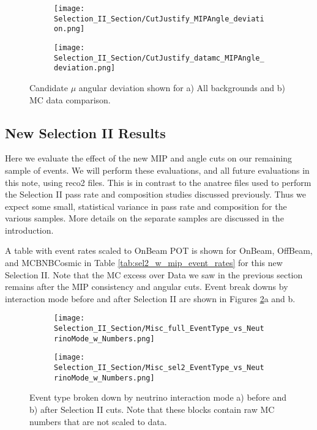 \begin{figure}[t!]
\centering
  \begin{subfigure}[t]{0.35\textwidth}
    \centering
\texttt{[image: Selection\_II\_Section/CutJustify\_MIPAngle\_deviation.png]}
    \caption{ }
  \end{subfigure} 
  \hspace{30mm}
  \begin{subfigure}[t]{0.35\textwidth}
    \centering
\texttt{[image: Selection\_II\_Section/CutJustify\_datamc\_MIPAngle\_deviation.png]}
    \caption{ }
  \end{subfigure} 
\caption{ Candidate $\mu$ angular deviation shown for a) All backgrounds and b) MC data comparison. }
\label{fig:cutjust_sel2_multall_deviation}
\end{figure}

\clearpage

\subsection{New Selection II Results}
Here we evaluate the effect of the new MIP and angle cuts on our remaining sample of events.  We will perform these evaluations, and all future evaluations in this note, using reco2 files. This is in contrast to the anatree files used to perform the Selection II pass rate and composition studies discussed previously. Thus we expect some small, statistical variance in pass rate and composition for the various samples.  More details on the separate samples are discussed in the introduction.
\par A table with event rates scaled to OnBeam POT is shown for OnBeam, OffBeam, and MCBNBCosmic in Table \ref{tab:sel2_w_mip_event_rates} for this new Selection II. Note that the MC excess over Data we saw in the previous section remains after the MIP consistency and angular cuts. Event break downs by interaction mode before and after Selection II are shown in Figures \ref{fig:physics_sel2_inttype}a and b.  
\begin{figure}[t!]
\centering
  \begin{subfigure}[t]{0.35\textwidth}
    \centering
\texttt{[image: Selection\_II\_Section/Misc\_full\_EventType\_vs\_NeutrinoMode\_w\_Numbers.png]}
    \caption{ }
  \end{subfigure} 
  \hspace{20 mm}
  \begin{subfigure}[t]{0.35\textwidth}
    \centering
\texttt{[image: Selection\_II\_Section/Misc\_sel2\_EventType\_vs\_NeutrinoMode\_w\_Numbers.png]}
    \caption{ }
  \end{subfigure} 

\caption{ Event type broken down by neutrino interaction mode a) before and b) after Selection II cuts. Note that these blocks contain raw MC numbers that are not scaled to data. }
\label{fig:physics_sel2_inttype}
\end{figure}


